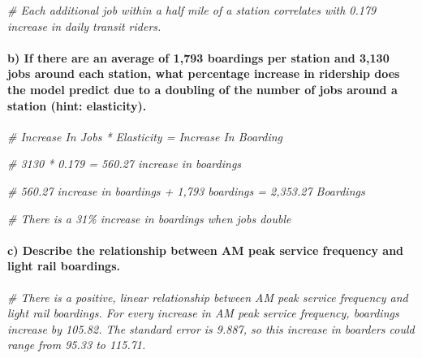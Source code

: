 \documentclass[
]{article}
\newenvironment{Shaded}{\begin{snugshade}}{\end{snugshade}}
\newcommand{\CommentTok}[1]{\textcolor[rgb]{0.56,0.35,0.01}{\textit{#1}}}
\begin{document}
\begin{Shaded}
\begin{Highlighting}[]
\CommentTok{\# Each additional job within a half mile of a station correlates with 0.179 increase in daily transit riders.}
\end{Highlighting}
\end{Shaded}

\hypertarget{b-if-there-are-an-average-of-1793-boardings-per-station-and-3130-jobs-around-each-station-what-percentage-increase-in-ridership-does-the-model-predict-due-to-a-doubling-of-the-number-of-jobs-around-a-station-hint-elasticity.}{%
\paragraph{b) If there are an average of 1,793 boardings per station and
3,130 jobs around each station, what percentage increase in ridership
does the model predict due to a doubling of the number of jobs around a
station (hint:
elasticity).}\label{b-if-there-are-an-average-of-1793-boardings-per-station-and-3130-jobs-around-each-station-what-percentage-increase-in-ridership-does-the-model-predict-due-to-a-doubling-of-the-number-of-jobs-around-a-station-hint-elasticity.}}

\begin{Shaded}
\begin{Highlighting}[]
\CommentTok{\# Increase In Jobs * Elasticity = Increase In Boarding }

\CommentTok{\# 3130 * 0.179 = 560.27 increase in boardings }

\CommentTok{\# 560.27 increase in boardings + 1,793 boardings = 2,353.27 Boardings }

\CommentTok{\# There is a 31\% increase in boardings when jobs double }
\end{Highlighting}
\end{Shaded}

\hypertarget{c-describe-the-relationship-between-am-peak-service-frequency-and-light-rail-boardings.}{%
\paragraph{c) Describe the relationship between AM peak service
frequency and light rail
boardings.}\label{c-describe-the-relationship-between-am-peak-service-frequency-and-light-rail-boardings.}}

\begin{Shaded}
\begin{Highlighting}[]
\CommentTok{\# There is a positive, linear relationship between AM peak service frequency and light rail boardings. For every increase in AM peak service frequency, boardings increase by 105.82.  The standard error is 9.887, so this increase in boarders could range from 95.33 to 115.71. }
\end{Highlighting}
\end{Shaded}
\end{document}
